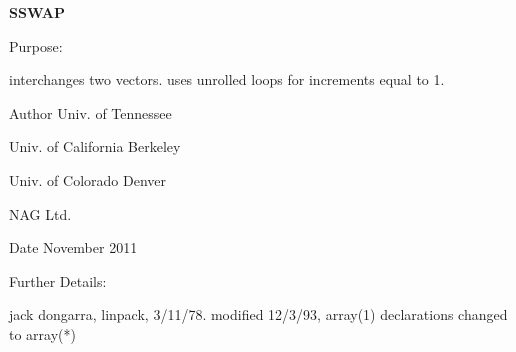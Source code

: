 {\bfseries S\+S\+W\+A\+P} 

\begin{DoxyParagraph}{Purpose\+: }
\begin{DoxyVerb}    interchanges two vectors.
    uses unrolled loops for increments equal to 1.\end{DoxyVerb}
 
\end{DoxyParagraph}
\begin{DoxyAuthor}{Author}
Univ. of Tennessee 

Univ. of California Berkeley 

Univ. of Colorado Denver 

N\+A\+G Ltd. 
\end{DoxyAuthor}
\begin{DoxyDate}{Date}
November 2011 
\end{DoxyDate}
\begin{DoxyParagraph}{Further Details\+: }
\begin{DoxyVerb}     jack dongarra, linpack, 3/11/78.
     modified 12/3/93, array(1) declarations changed to array(*)\end{DoxyVerb}
 
\end{DoxyParagraph}
